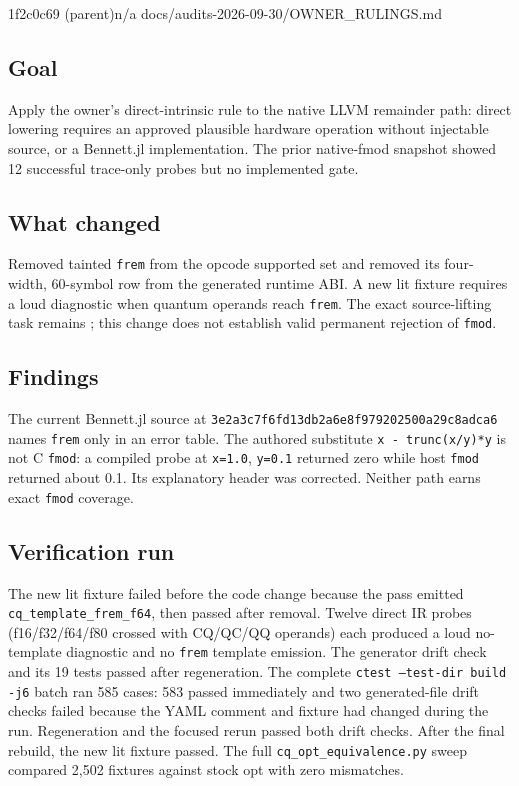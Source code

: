 %
  {1f2c0c69 (parent)}{n/a}%
  {docs/audits-2026-09-30/OWNER\_RULINGS.md}

\subsection*{Goal}
Apply the owner's direct-intrinsic rule to the native LLVM remainder path:
direct lowering requires an approved plausible hardware operation without
injectable source, or a Bennett.jl implementation. The prior native-fmod
snapshot showed 12 successful trace-only probes but no implemented gate.

\subsection*{What changed}
Removed tainted \texttt{frem} from the opcode supported set and removed its
four-width, 60-symbol row from the generated runtime ABI. A new lit fixture
requires a loud diagnostic when quantum operands reach \texttt{frem}.
The exact source-lifting task remains ; this change does not
establish valid permanent rejection of \texttt{fmod}.

\subsection*{Findings}
The current Bennett.jl source at
\texttt{3e2a3c7f6fd13db2a6e8f979202500a29c8adca6} names \texttt{frem}
only in an error table. The authored substitute
\texttt{x - trunc(x/y)*y} is not C \texttt{fmod}: a compiled probe at
\texttt{x=1.0}, \texttt{y=0.1} returned zero while host \texttt{fmod}
returned about 0.1. Its explanatory header was corrected. Neither path
earns exact \texttt{fmod} coverage.

\subsection*{Verification run}
The new lit fixture failed before the code change because the pass emitted
\texttt{cq\_template\_frem\_f64}, then passed after removal. Twelve direct
IR probes (f16/f32/f64/f80 crossed with CQ/QC/QQ operands) each produced a
loud no-template diagnostic and no \texttt{frem} template emission.
The generator drift check and its 19 tests passed after regeneration.
The complete \texttt{ctest --test-dir build -j6} batch ran 585 cases:
583 passed immediately and two generated-file drift checks failed because
the YAML comment and fixture had changed during the run. Regeneration and
the focused rerun passed both drift checks. After the final rebuild, the
new lit fixture passed. The full \texttt{cq\_opt\_equivalence.py} sweep
compared 2,502 fixtures against stock opt with zero mismatches.

